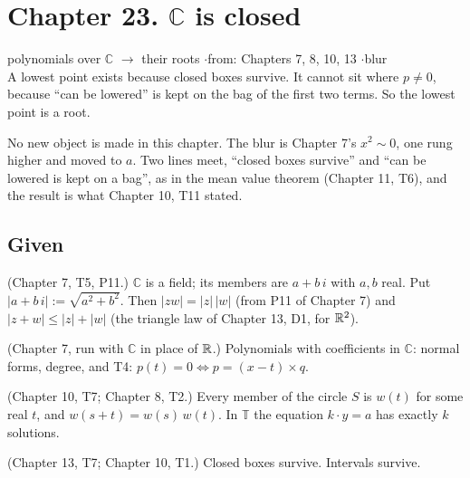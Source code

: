 \newpage

\section*{Chapter 23. $\mathbb{C}$ is closed}
\begin{center}
{\normalsize polynomials over $\mathbb{C}$ $\to$ their roots \quad$\cdot$\quad from: Chapters 7, 8, 10, 13 \quad$\cdot$\quad blur}\\[4pt]
{\small A lowest point exists because closed boxes survive. It cannot sit where $p \neq 0$, because ``can be lowered'' is kept on the bag of the first two terms. So the lowest point is a root.}
\end{center}

No new object is made in this chapter. The blur is Chapter 7's $x^2 \sim 0$, one rung higher and moved to $a$. Two lines meet, ``closed boxes survive'' and ``can be lowered is kept on a bag'', as in the mean value theorem (Chapter 11, T6), and the result is what Chapter 10, T11 stated.

\subsection*{Given}

\begin{lines}
\item[\lab{G1}] (Chapter 7, T5, P11.) $\mathbb{C}$ is a field; its members are $a + b\,i$ with $a, b$ real. Put $|a + b\,i| := \sqrt{a^2 + b^2}$. Then $|z w| = |z|\,|w|$ (from P11 of Chapter 7) and $|z + w| \le |z| + |w|$ (the triangle law of Chapter 13, D1, for $\mathbb{R}^2$).
\item[\lab{G2}] (Chapter 7, run with $\mathbb{C}$ in place of $\mathbb{R}$.) Polynomials with coefficients in $\mathbb{C}$: normal forms, degree, and T4: $p(t) = 0 \iff p = (x - t) \times q$.
\item[\lab{G3}] (Chapter 10, T7; Chapter 8, T2.) Every member of the circle $S$ is $w(t)$ for some real $t$, and $w(s + t) = w(s)\,w(t)$. In $\mathbb{T}$ the equation $k \cdot y = a$ has exactly $k$ solutions.
\item[\lab{G4}] (Chapter 13, T7; Chapter 10, T1.) Closed boxes survive. Intervals survive.
\end{lines}

